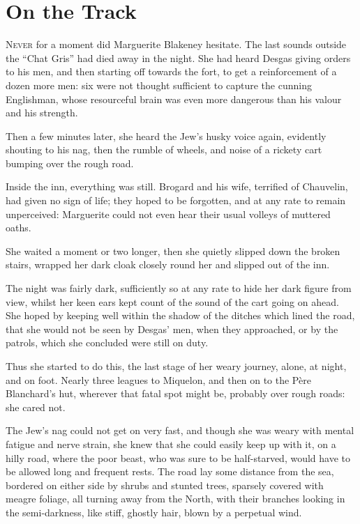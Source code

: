 
\chapter{On the Track}
\lettrine[lines=4]{N}{ever} for a moment did Marguerite Blakeney hesitate. The last sounds outside the \enquote{Chat Gris} had died away in the night. She had heard Desgas giving orders to his men, and then starting off towards the fort, to get a reinforcement of a dozen more men: six were not thought sufficient to capture the cunning Englishman, whose resourceful brain was even more dangerous than his valour and his strength.

Then a few minutes later, she heard the Jew's husky voice again, evidently shouting to his nag, then the rumble of wheels, and noise of a rickety cart bumping over the rough road.

Inside the inn, everything was still. Brogard and his wife, terrified of Chauvelin, had given no sign of life; they hoped to be forgotten, and at any rate to remain unperceived: Marguerite could not even hear their usual volleys of muttered oaths.

She waited a moment or two longer, then she quietly slipped down the broken stairs, wrapped her dark cloak closely round her and slipped out of the inn.

The night was fairly dark, sufficiently so at any rate to hide her dark figure from view, whilst her keen ears kept count of the sound of the cart going on ahead. She hoped by keeping well within the shadow of the ditches which lined the road, that she would not be seen by Desgas’ men, when they approached, or by the patrols, which she concluded were still on duty.

Thus she started to do this, the last stage of her weary journey, alone, at night, and on foot. Nearly three leagues to Miquelon, and then on to the Père Blanchard's hut, wherever that fatal spot might be, probably over rough roads: she cared not.

The Jew's nag could not get on very fast, and though she was weary with mental fatigue and nerve strain, she knew that she could easily keep up with it, on a hilly road, where the poor beast, who was sure to be half-starved, would have to be allowed long and frequent rests. The road lay some distance from the sea, bordered on either side by shrubs and stunted trees, sparsely covered with meagre foliage, all turning away from the North, with their branches looking in the semi-darkness, like stiff, ghostly hair, blown by a perpetual wind.


